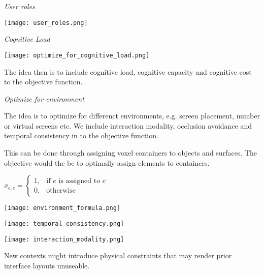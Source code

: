 \textit{User roles}

\begin{center}
	\texttt{[image: user\_roles.png]}
\end{center}

\textit{Cognitive Load}

\begin{center}
	\texttt{[image: optimize\_for\_cognitive\_load.png]}
\end{center}


The idea then is to include cognitive load, cognitive capacity and cognitive cost to the objective function. \medskip

\textit{Optimize for environment} \smallskip

The idea is to optimize for differenct environments, e.g. screen placement, number or virtual screens etc. 
We include interaction modality, occlusion avoidance and temporal consistency in to the objective function. \smallskip

This can be done through assigning voxel containers to objects and surfaces. The objective would the be to optimally assign elements to containers. 

$x_{e,c} = \begin{cases} 1, & \text{if } e \text{ is assigned to } c \\ 0, & \text{otherwise} \end{cases}$

\begin{center}
	\texttt{[image: environment\_formula.png]}
\end{center}

\begin{center}
	\texttt{[image: temporal\_consistency.png]}
\end{center}


\begin{center}
	\texttt{[image: interaction\_modality.png]}
\end{center}

New contexts might introduce physical constraints that may render prior interface layouts unuseable. 

\columnbreak






